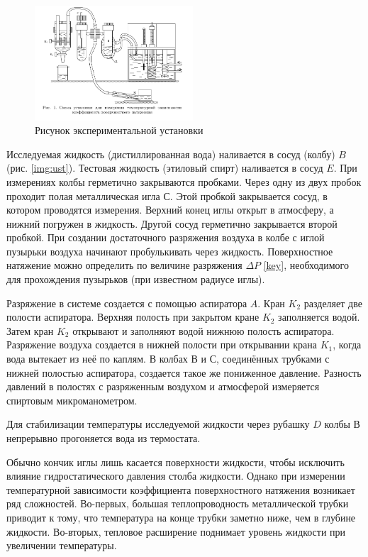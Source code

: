 \documentclass[a4paper,12pt]{article}
\theoremstyle{definition}
\begin{document}
	\begin{figure}
		\begin{center}
			\includegraphics[width=5.9cm]{Screenshot from 2023-02-19 17-25-26.png}
			\caption{Рисунок экспериментальной установки}
			\label{img:ust}
		\end{center}
	\end{figure}
	
	Исследуемая жидкость (дистиллированная вода) наливается в сосуд (колбу) $ B $ (рис. \eqref{img:ust}). Тестовая жидкость  (этиловый спирт) наливается  в сосуд $ E $.  При измерениях  колбы герметично закрываются  пробками. Через одну из двух пробок  проходит полая металлическая игла $ С $. Этой пробкой закрывается сосуд, в котором  проводятся измерения. Верхний конец иглы открыт в атмосферу, а нижний погружен в жидкость. Другой сосуд герметично закрывается второй пробкой. При создании достаточного  разряжения воздуха в колбе с иглой пузырьки воздуха начинают пробулькивать через жидкость. Поверхностное натяжение можно определить по величине разряжения $ \Delta P $ \eqref{key}, необходимого для прохождения пузырьков (при известном радиусе иглы).
	
	Разряжение в системе создается с помощью аспиратора $ A $. Кран $ K_2 $ разделяет две полости аспиратора. Верхняя полость при закрытом кране $ K_2 $ заполняется водой. Затем кран $ K_2 $ открывают и заполняют водой  нижнюю полость  аспиратора.  Разряжение воздуха создается в нижней полости  при открывании крана $ K_1 $, когда  вода вытекает из неё по каплям. В колбах $ В $ и $ С $, соединённых трубками с нижней полостью аспиратора, создается такое же пониженное давление. Разность давлений в полостях с разряженным воздухом и атмосферой измеряется спиртовым микроманометром. 
	
	Для стабилизации температуры исследуемой жидкости через рубашку $ D $ колбы $ В $ непрерывно прогоняется вода из термостата.
	
	Обычно кончик иглы лишь касается поверхности жидкости, чтобы исключить влияние гидростатического давления столба жидкости. Однако при измерении температурной зависимости коэффициента поверхностного натяжения возникает ряд сложностей. Во-первых, большая теплопроводность металлической трубки приводит к тому, что температура на конце трубки заметно ниже, чем в глубине жидкости. Во-вторых, тепловое расширение поднимает уровень жидкости при увеличении температуры.
	
\end{document}
